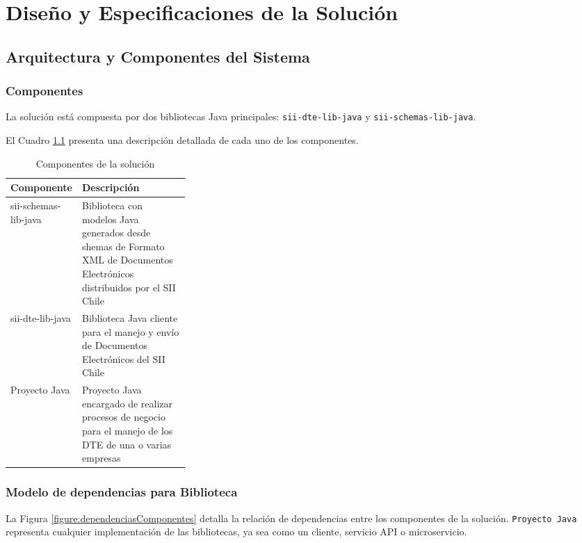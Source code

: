 \chapter{Diseño y Especificaciones de la Solución}

\section{Arquitectura y Componentes del Sistema}

\subsection{Componentes}

La solución está compuesta por dos bibliotecas Java principales: \texttt{sii-dte-lib-java} y \texttt{sii-schemas-lib-java}.

El Cuadro \ref{tab:componentesSolucion} presenta una descripción detallada de cada uno de los componentes.

\begin{table}
    \centering
    \caption{Componentes de la solución}
    \begin{tabularx}{\linewidth}{|p{0.3\linewidth}|X|}
        \hline
        \textbf{Componente} &
        \textbf{Descripción}\\
        \hline
        sii-schemas-lib-java & Biblioteca con modelos Java generados desde shemas de Formato XML de Documentos Electrónicos distribuidos por el SII Chile \\
        \hline
        sii-dte-lib-java & Biblioteca Java cliente para el manejo y envío de Documentos Electrónicos del SII Chile \\
        \hline
        Proyecto Java & Proyecto Java encargado de realizar procesos de negocio para el manejo de los DTE de una o varias empresas \\
        \hline
    \end{tabularx}
    \label{tab:componentesSolucion}
\end{table}

\subsection{Modelo de dependencias para Biblioteca}

La Figura \ref{figure:dependenciasComponentes} detalla la relación de dependencias entre los componentes de la solución. \texttt{Proyecto Java} representa cualquier implementación de las bibliotecas, ya sea como un cliente, servicio API o microservicio.

